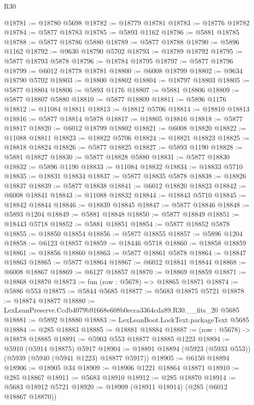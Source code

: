 \begin{lexlean}{R30}
\begin{coremodule}
@18781 := @18780 @5698
@18782 := @18779 @18781
@18783 := @18776 @18782
@18784 := @5877 @18783
@18785 := @5893 @1162
@18786 := @5881 @18785
@18788 := @5877 @18786 @5880
@18789 := @5877 @18788
@18790 := @5896 @1162
@18792 := @9630 @18790 @5702
@18793 := @18789 @18792
@18795 := @5877 @18793 @5878
@18796 := @18784 @18795
@18797 := @5877 @18796
@18799 := @6012 @18778 @18781
@18800 := @6008 @18799
@18802 := @9634 @18790 @5702
@18803 := @18800 @18802
@18804 := @18797 @18803
@18805 := @5877 @18804
@18806 := @5893 @1176
@18807 := @5881 @18806
@18809 := @5877 @18807 @5880
@18810 := @5877 @18809
@18811 := @5896 @1176
@18812 := @11084 @18811
@18813 := @18812 @5706
@18814 := @18810 @18813
@18816 := @5877 @18814 @5878
@18817 := @18805 @18816
@18818 := @5877 @18817
@18820 := @6012 @18799 @18802
@18821 := @6008 @18820
@18822 := @11088 @18811
@18823 := @18822 @5706
@18824 := @18821 @18823
@18825 := @18818 @18824
@18826 := @5877 @18825
@18827 := @5893 @1190
@18828 := @5881 @18827
@18830 := @5877 @18828 @5880
@18831 := @5877 @18830
@18832 := @5896 @1190
@18833 := @11084 @18832
@18834 := @18833 @5710
@18835 := @18831 @18834
@18837 := @5877 @18835 @5878
@18838 := @18826 @18837
@18839 := @5877 @18838
@18841 := @6012 @18820 @18823
@18842 := @6008 @18841
@18843 := @11088 @18832
@18844 := @18843 @5710
@18845 := @18842 @18844
@18846 := @18839 @18845
@18847 := @5877 @18846
@18848 := @5893 @1204
@18849 := @5881 @18848
@18850 := @5877 @18849
@18851 := @18443 @5718
@18852 := @5881 @18851
@18854 := @5877 @18852 @5878
@18855 := @18850 @18854
@18856 := @5877 @18855
@18857 := @5896 @1204
@18858 := @6123 @18857
@18859 := @18446 @5718
@18860 := @18858 @18859
@18861 := @18856 @18860
@18863 := @5877 @18861 @5878
@18864 := @18847 @18863
@18865 := @5877 @18864
@18867 := @6012 @18841 @18844
@18868 := @6008 @18867
@18869 := @6127 @18857
@18870 := @18869 @18859
@18871 := @18868 @18870
@18873 := fun (row : @5678) => @18865 @18871
@18874 := @5886 @553
@18875 := @5844 @5685
@18877 := @5683 @18875 @5721
@18878 := @18874 @18877
@18880 := LexLeanPreserve.Ccdb4079b91668e608b0ecca3364cda89.R30.__fits_20 @5685
@18881 := @5892 @18880
@18883 := LexLeanBoot.LockText.packageText @5685
@18884 := @285 @18883
@18885 := @18881 @18884
@18887 := (row : @5678) -> @18878 @18885
@18891 := @5903 @553 @18877 @18885 @1223
@18894 := @5910 (@5914 @18875) @5917
@18904 := @18891 @18894 (@5923 (@5933 @553)) (@5939 (@5940 (@5941 @1223) @18877 @5917))
@18905 := @6150 @18894
@18906 := @18905 @34
@18909 := @18906 @1221 @18864 @18871
@18910 := @285 @18867
@18911 := @5683 @18910
@18912 := @285 @18870
@18914 := @5683 @18912 @5721
@18920 := @18909 (@18911 @18914) (@285 (@6012 @18867 @18870))

\end{coremodule}
\end{lexlean}
